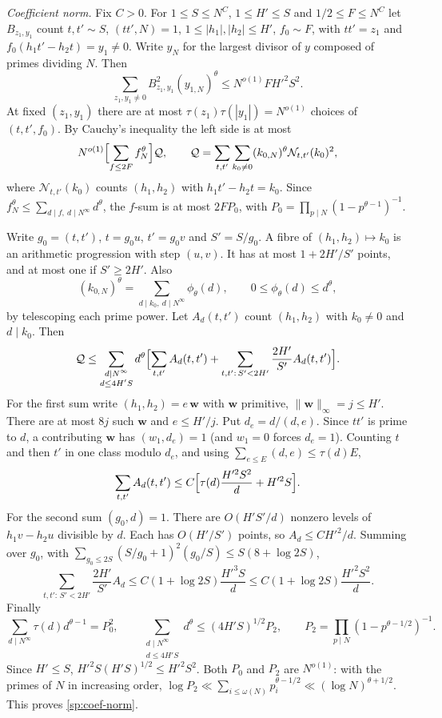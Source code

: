 \emph{Coefficient norm.} Fix $C>0$. For $1\le S\le N^C$, $1\le H'\le S$ and
$1/2\le F\le N^C$ let $B_{z_1,y_1}$ count $t,t'\sim S$, $(tt',N)=1$,
$1\le|h_1|,|h_2|\le H'$, $f_0\sim F$, with $tt'=z_1$ and
$f_0(h_1t'-h_2t)=y_1\ne0$. Write $y_N$ for the largest divisor of $y$ composed
of primes dividing $N$. Then
\begin{equation}\label{sp:coef-norm}
 \sum_{z_1,y_1\ne0}B_{z_1,y_1}^2(y_{1,N})^\theta\le N^{o(1)}FH'^2S^2 .
\end{equation}
At fixed $(z_1,y_1)$ there are at most $\tau(z_1)\tau(|y_1|)=N^{o(1)}$
choices of $(t,t',f_0)$. By Cauchy's inequality the left side is at most
\[
 N^{o(1)}\Bigl[\sum_{f\le2F}f_N^\theta\Bigr]\mathcal Q,\qquad
 \mathcal Q=\sum_{t,t'}\sum_{k_0\ne0}(k_{0,N})^\theta\mathcal N_{t,t'}(k_0)^2,
\]
where $\mathcal N_{t,t'}(k_0)$ counts $(h_1,h_2)$ with $h_1t'-h_2t=k_0$.
Since $f_N^\theta\le\sum_{d\mid f,\ d\mid N^\infty}d^\theta$, the $f$-sum is at
most $2FP_0$, with $P_0=\prod_{p\mid N}(1-p^{\theta-1})^{-1}$.

Write $g_0=(t,t')$, $t=g_0u$, $t'=g_0v$ and $S'=S/g_0$. A fibre of
$(h_1,h_2)\mapsto k_0$ is an arithmetic progression with step $(u,v)$. It
has at most $1+2H'/S'$ points, and at most one if $S'\ge2H'$. Also
\[
 (k_{0,N})^\theta=\sum_{d\mid k_0,\ d\mid N^\infty}\phi_\theta(d),\qquad
 0\le\phi_\theta(d)\le d^\theta,
\]
by telescoping each prime power. Let $A_d(t,t')$ count $(h_1,h_2)$ with
$k_0\ne0$ and $d\mid k_0$. Then
\begin{equation}\label{sp:Q-split}
 \mathcal Q\le\sum_{\substack{d\mid N^\infty\\d\le4H'S}}d^\theta
 \Bigl[\sum_{t,t'}A_d(t,t')+\sum_{t,t':\,S'<2H'}\frac{2H'}{S'}A_d(t,t')\Bigr].
\end{equation}
For the first sum write $(h_1,h_2)=e\,\mathbf w$ with $\mathbf w$ primitive,
$\|\mathbf w\|_\infty=j\le H'$. There are at most $8j$ such $\mathbf w$ and
$e\le H'/j$. Put $d_e=d/(d,e)$. Since $tt'$ is prime to $d$, a contributing
$\mathbf w$ has $(w_1,d_e)=1$ (and $w_1=0$ forces $d_e=1$). Counting $t$ and
then $t'$ in one class modulo $d_e$, and using
$\sum_{e\le E}(d,e)\le\tau(d)E$,
\begin{equation}\label{sp:Ad1}
 \sum_{t,t'}A_d(t,t')\le C\Bigl[\tau(d)\frac{H'^2S^2}d+H'^2S\Bigr].
\end{equation}
For the second sum $(g_0,d)=1$. There are $O(H'S'/d)$ nonzero levels of
$h_1v-h_2u$ divisible by $d$. Each has $O(H'/S')$ points, so
$A_d\le CH'^2/d$. Summing over $g_0$, with
$\sum_{g_0\le2S}(S/g_0+1)^2(g_0/S)\le S(8+\log2S)$,
\begin{equation}\label{sp:Ad2}
 \sum_{t,t':\,S'<2H'}\frac{2H'}{S'}A_d\le C(1+\log2S)\frac{H'^3S}d
 \le C(1+\log2S)\frac{H'^2S^2}d .
\end{equation}
Finally
\[
 \sum_{d\mid N^\infty}\tau(d)d^{\theta-1}=P_0^2,\qquad
 \sum_{\substack{d\mid N^\infty\\d\le4H'S}}d^\theta\le(4H'S)^{1/2}P_2,\qquad
 P_2=\prod_{p\mid N}(1-p^{\theta-1/2})^{-1}.
\]
Since $H'\le S$, $H'^2S(H'S)^{1/2}\le H'^2S^2$. Both $P_0$ and $P_2$ are
$N^{o(1)}$: with the primes of $N$ in increasing order,
$\log P_2\ll\sum_{i\le\omega(N)}p_i^{\theta-1/2}\ll(\log N)^{\theta+1/2}$.
This proves \eqref{sp:coef-norm}.

